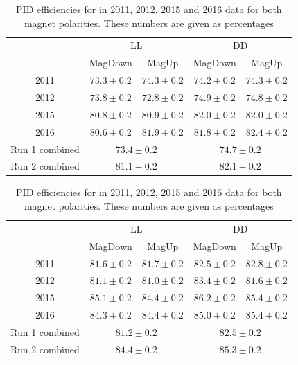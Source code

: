 \begin{table}[h]
\centering
\begin{tabular}{c|cc|cc}
\hline
& \multicolumn{2}{c}{LL} & \multicolumn{2}{c}{DD} \\
& MagDown & MagUp & MagDown & MagUp \\
\hline
2011 & $73.3 \pm 0.2$ & $74.3 \pm 0.2$ & $74.2 \pm 0.2$ & $74.3 \pm 0.2$ \\
2012 & $73.8 \pm 0.2$ & $72.8 \pm 0.2$ & $74.9 \pm 0.2$ & $74.8 \pm 0.2$ \\
2015 & $80.8 \pm 0.2$ & $80.9 \pm 0.2$ & $82.0 \pm 0.2$ & $82.0 \pm 0.2$ \\
2016 & $80.6 \pm 0.2$ & $81.9 \pm 0.2$ & $81.8 \pm 0.2$ & $82.4 \pm 0.2$ \\
\hline
Run 1 combined & \multicolumn{2}{c}{$73.4 \pm 0.2$} & \multicolumn{2}{c}{$74.7 \pm 0.2$} \\
Run 2 combined & \multicolumn{2}{c}{$81.1 \pm 0.2$} & \multicolumn{2}{c}{$82.1 \pm 0.2$} \\
\hline
\end{tabular}
\caption{PID efficiencies for \decay{\Dz}{\Km\pip} in 2011, 2012, 2015 and 2016 data for both magnet polarities. These numbers are given as percentages}
\label{pideffkpi}
\end{table}

\begin{table}[h]
\centering
\begin{tabular}{c|cc|cc}
\hline
& \multicolumn{2}{c}{LL} & \multicolumn{2}{c}{DD} \\
& MagDown & MagUp & MagDown & MagUp \\
\hline
2011 & $81.6 \pm 0.2$ & $81.7 \pm 0.2$ & $82.5 \pm 0.2$ & $82.8 \pm 0.2$ \\
2012 & $81.1 \pm 0.2$ & $81.0 \pm 0.2$ & $83.4 \pm 0.2$ & $81.6 \pm 0.2$ \\
2015 & $85.1 \pm 0.2$ & $84.4 \pm 0.2$ & $86.2 \pm 0.2$ & $85.4 \pm 0.2$ \\
2016 & $84.3 \pm 0.2$ & $84.4 \pm 0.2$ & $85.0 \pm 0.2$ & $85.4 \pm 0.2$ \\
\hline
Run 1 combined & \multicolumn{2}{c}{$81.2 \pm 0.2$} & \multicolumn{2}{c}{$82.5 \pm 0.2$} \\
Run 2 combined & \multicolumn{2}{c}{$84.4 \pm 0.2$} & \multicolumn{2}{c}{$85.3 \pm 0.2$} \\
\hline
\end{tabular}
\caption{PID efficiencies for \decay{\Dz}{\Kp\Km} in 2011, 2012, 2015 and 2016 data for both magnet polarities. These numbers are given as percentages}
\label{pideffkk}
\end{table}

